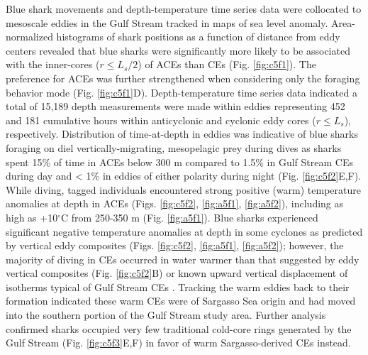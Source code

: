 Blue shark movements and depth-temperature time series data were collocated to mesoscale eddies in the Gulf Stream tracked in maps of sea level anomaly. Area-normalized histograms of shark positions as a function of distance from eddy centers revealed that blue sharks were significantly more likely to be associated with the inner-cores ($r \leq L_s / 2$) of ACEs than CEs (Fig. \ref{fig:c5f1}). The preference for ACEs was further strengthened when considering only the foraging behavior mode (Fig. \ref{fig:c5f1}D). Depth-temperature time series data indicated a total of 15,189 depth measurements were made within eddies representing 452 and 181 cumulative hours within anticyclonic and cyclonic eddy cores ($r \leq L_s$), respectively. Distribution of time-at-depth in eddies was indicative of blue sharks foraging on diel vertically-migrating, mesopelagic prey during dives as sharks spent 15\% of time in ACEs below 300 m compared to 1.5\% in Gulf Stream CEs during day and < 1\% in eddies of either polarity during night (Fig. \ref{fig:c5f2}E,F). While diving, tagged individuals encountered strong positive (warm) temperature anomalies at depth in ACEs (Figs. \ref{fig:c5f2}, \ref{fig:a5f1}, \ref{fig:a5f2}), including as high as +10$^\circ$C from 250-350 m (Fig. \ref{fig:a5f1}). Blue sharks experienced significant negative temperature anomalies at depth in some cyclones as predicted by vertical eddy composites (Figs. \ref{fig:c5f2}, \ref{fig:a5f1}, \ref{fig:a5f2}); however, the majority of diving in CEs occurred in water warmer than that suggested by eddy vertical composites (Fig. \ref{fig:c5f2}B) or known upward vertical displacement of isotherms typical of Gulf Stream CEs \citep[cold-core rings;][]{Gaube2014, Gaube2018}. Tracking the warm eddies back to their formation indicated these warm CEs were of Sargasso Sea origin and had moved into the southern portion of the Gulf Stream study area. Further analysis confirmed sharks occupied very few traditional cold-core rings generated by the Gulf Stream (Fig. \ref{fig:c5f3}E,F) in favor of warm Sargasso-derived CEs instead.

\clearpage

